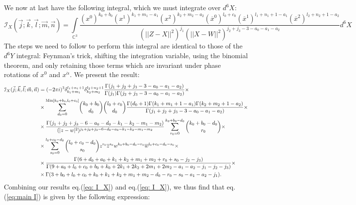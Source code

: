 \documentclass[../main.tex]{subfiles}
\begin{document}
We now at last have the following integral, which we must integrate over $d^6X$:
\begin{equation*}
   \mathcal{I}_X(\vec{j};\vec{k},\vec{l};\vec{m}, \vec{n}) = \underset{\mathbb{C}^3}{\int} \frac{(x^0)^{k_0+b_0} (x^1)^{k_1+m_1-a_1} (x^2)^{k_2+m_2-a_2} (\overline{x}^0)^{l_0+c_0} (\overline{x}^1)^{l_1+n_1+1-a_1} (\overline{x}^2)^{l_2+n_2+1-a_2}}{(\vert \vert Z-X \vert \vert^2)^{j_1} (\vert \vert X-W \vert \vert^2)^{j_2+j_3-3-a_0-a_1-a_2}} d^6X
\end{equation*}
The steps we need to follow to perform this integral are identical to those of the $d^6Y$ integral: Feynman's trick, shifting the integration variable, using the binomial theorem, and only retaining those terms which are invariant under phase rotations of $x^0$ and $x^{\dot{\alpha}}$. We present the result:
\begingroup \allowdisplaybreaks \begin{align}
\mathcal{I}_X(\vec{j};\vec{k},\vec{l};\vec{m}, \vec{n}) &= (-2\pi i)^3 \delta_{k_1+m_1}^{l_1+n_1+1} \delta_{k_2+m_2}^{l_2+n_2+1} \frac{\Gamma(j_1+j_2+j_3-3-a_0-a_1-a_2)}{\Gamma(j_1) \Gamma(j_2+j_3-3-a_0-a_1-a_2)} \times \label{eq: I_X} \\
&\times \overset{\text{Min}[k_0+b_0,l_0+c_0]}{\sum_{d_0=0}} {k_0+b_0 \choose d_0} {l_0+c_0 \choose d_0} \frac{\Gamma(d_0+1) \Gamma(k_1+m_1+1-a_1) \Gamma(k_2+m_2+1-a_2)}{\Gamma(j_1+j_2+j_3-3-a_0-a_1-a_2)} \times \notag \\
&\times \frac{\Gamma(j_1+j_2+j_3-6-a_0-d_0-k_1-k_2-m_1-m_2)}{(\vert z-w \vert^2)^{j_1+j_2+j_3-6-d_0-a_0-k_1-k_2-m_1-m_2}} \sum_{r_0=0}^{k_0+b_0-d_0}  {k_0+b_0-d_0 \choose r_0} \times \notag \\
&\times \sum_{s_0=0}^{l_0+c_0-d_0} {l_0+c_0-d_0 \choose s_0} z^{r_0} \overline{z}^{s_0} w^{k_0+b_0-d_0-r_0} \overline{w}^{l_0+c_0-d_0-s_0} \times \notag \\
&\times \frac{\Gamma(6+d_0+a_0+k_1+k_2+m_1+m_2+r_0+s_0-j_2-j_3)}{\Gamma(9+a_0+l_0+c_0+b_0+k_0+2k_1+2k_2+2m_1+2m_2-a_1-a_2-j_1-j_2-j_3)} \times \notag \\
&\times \Gamma(3+b_0+l_0+c_0+k_0+k_1+k_2+m_1+m_2-d_0-r_0-s_0-a_1-a_2-j_1). \notag
\end{align} \endgroup
Combining our results eq.(\ref{eq: I_X}) and eq.(\ref{eq: I_X}), we thus find that eq.(\ref{eq:main I}) is given by the following expression:
\end{document}
